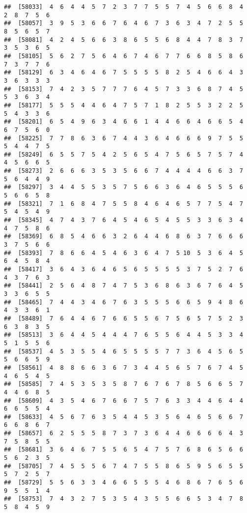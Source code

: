 \documentclass[
]{book}
\begin{document}
\begin{verbatim}
##  [58033]  4  6  4  4  5  7  2  3  7  7  5  5  7  4  5  6  6  8  4  2  8  7  5  6
##  [58057]  3  9  5  3  6  6  7  6  4  6  7  3  6  3  4  7  2  5  5  8  5  6  5  7
##  [58081]  4  2  4  5  6  6  3  8  6  5  5  6  8  4  4  7  8  3  7  3  5  3  6  5
##  [58105]  5  6  2  7  5  6  4  6  7  4  6  7  7  6  6  8  5  8  6  7  3  7  7  6
##  [58129]  6  3  4  6  4  6  7  5  5  5  5  8  2  5  4  6  6  4  3  3  6  3  3  3
##  [58153]  7  4  2  3  5  7  7  7  6  4  5  7  3  3  6  8  7  4  5  5  3  6  3  4
##  [58177]  5  5  5  4  4  6  4  7  5  7  1  8  2  5  5  3  2  2  5  5  4  3  3  6
##  [58201]  6  5  4  9  6  3  4  6  6  1  4  4  6  6  4  6  6  5  4  6  7  5  6  0
##  [58225]  7  7  8  6  3  6  7  4  4  3  6  4  6  6  6  9  7  5  5  5  4  4  7  5
##  [58249]  6  5  5  7  5  4  2  5  6  5  4  7  5  6  5  7  5  7  4  4  5  6  6  5
##  [58273]  2  6  6  6  3  5  3  5  6  6  7  4  4  4  4  6  6  3  7  5  6  4  4  9
##  [58297]  3  4  4  5  5  3  5  7  5  6  6  3  6  4  6  5  5  5  6  5  6  6  5  8
##  [58321]  7  1  6  8  4  7  5  5  8  4  6  4  6  5  7  7  5  4  7  5  4  5  4  9
##  [58345]  4  7  4  3  7  6  4  5  4  6  5  4  5  5  3  3  6  3  4  4  7  5  8  6
##  [58369]  6  8  5  4  6  6  3  2  6  4  4  6  8  6  3  7  6  6  6  3  7  5  6  6
##  [58393]  7  8  6  6  4  5  4  6  3  6  4  7  5 10  5  3  6  4  5  6  4  5  8  4
##  [58417]  3  6  4  3  6  4  6  5  6  5  5  5  5  3  7  5  2  7  6  4  3  7  6  3
##  [58441]  2  5  6  4  8  7  4  7  5  3  6  8  6  3  6  7  6  4  5  3  3  6  5  5
##  [58465]  7  4  4  3  4  6  7  6  3  5  5  5  6  6  5  9  4  8  6  4  3  3  6  1
##  [58489]  7  6  4  4  6  7  6  6  5  5  6  7  5  6  5  7  5  2  3  6  3  8  3  5
##  [58513]  3  6  4  4  5  4  4  4  7  6  5  5  6  4  4  5  3  3  4  5  1  5  5  6
##  [58537]  4  5  3  5  5  4  6  5  5  5  5  7  7  3  6  4  5  6  5  5  6  6  5  9
##  [58561]  4  8  8  6  6  3  6  7  3  4  4  5  6  5  7  6  7  4  5  4  6  5  4  5
##  [58585]  7  4  5  3  5  3  5  8  7  6  7  6  7  8  5  6  6  5  7  4  4  6  8  5
##  [58609]  4  3  5  4  6  7  6  6  7  5  7  6  3  3  4  4  6  4  4  6  6  5  5  4
##  [58633]  4  5  6  7  6  3  5  4  4  5  3  5  6  4  6  5  6  6  7  6  6  8  6  7
##  [58657]  6  2  5  5  5  8  7  3  7  3  6  4  4  6  6  6  6  4  3  7  5  8  5  5
##  [58681]  3  6  4  6  7  5  5  6  5  4  7  5  7  6  8  6  5  6  6  5  6  2  3  5
##  [58705]  7  4  5  5  5  6  7  4  7  5  5  8  6  5  9  5  6  5  5  5  7  2  5  7
##  [58729]  5  5  6  3  3  4  6  6  5  5  5  4  6  8  6  7  6  5  6  9  5  5  1  4
##  [58753]  7  4  3  2  7  5  3  5  4  3  5  5  6  6  5  3  4  7  8  5  8  4  5  9

\end{verbatim}
\end{document}

